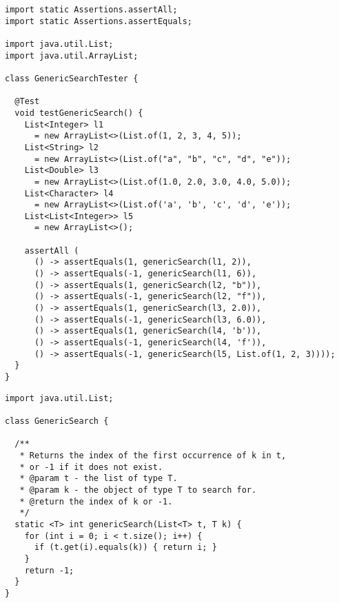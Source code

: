 
\begin{lstlisting}[language=MyJava]
import static Assertions.assertAll;
import static Assertions.assertEquals;

import java.util.List;
import java.util.ArrayList;

class GenericSearchTester {

  @Test 
  void testGenericSearch() {
    List<Integer> l1 
      = new ArrayList<>(List.of(1, 2, 3, 4, 5));
    List<String> l2 
      = new ArrayList<>(List.of("a", "b", "c", "d", "e"));
    List<Double> l3 
      = new ArrayList<>(List.of(1.0, 2.0, 3.0, 4.0, 5.0));
    List<Character> l4 
      = new ArrayList<>(List.of('a', 'b', 'c', 'd', 'e'));
    List<List<Integer>> l5 
      = new ArrayList<>();

    assertAll (
      () -> assertEquals(1, genericSearch(l1, 2)),
      () -> assertEquals(-1, genericSearch(l1, 6)),
      () -> assertEquals(1, genericSearch(l2, "b")),
      () -> assertEquals(-1, genericSearch(l2, "f")),
      () -> assertEquals(1, genericSearch(l3, 2.0)),
      () -> assertEquals(-1, genericSearch(l3, 6.0)),
      () -> assertEquals(1, genericSearch(l4, 'b')),
      () -> assertEquals(-1, genericSearch(l4, 'f')),
      () -> assertEquals(-1, genericSearch(l5, List.of(1, 2, 3))));
  }
}
\end{lstlisting}

\begin{lstlisting}[language=MyJava]
import java.util.List;

class GenericSearch {

  /**
   * Returns the index of the first occurrence of k in t, 
   * or -1 if it does not exist.
   * @param t - the list of type T.
   * @param k - the object of type T to search for.
   * @return the index of k or -1.
   */
  static <T> int genericSearch(List<T> t, T k) {
    for (int i = 0; i < t.size(); i++) {
      if (t.get(i).equals(k)) { return i; }
    }
    return -1;
  }
}
\end{lstlisting}

